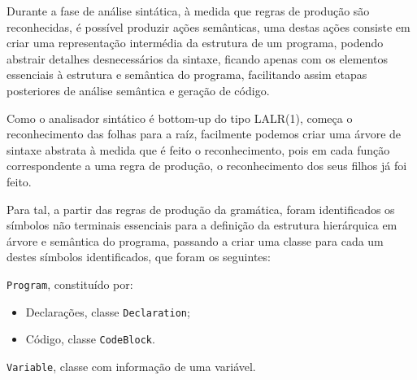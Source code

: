 \documentclass[12pt,a4paper]{report}
\begin{document}
Durante a fase de análise sintática, à medida que regras de produção são reconhecidas, é possível produzir ações semânticas, uma destas ações consiste em criar uma representação intermédia da estrutura de um programa,
podendo abstrair detalhes desnecessários da sintaxe, ficando apenas com os elementos essenciais à estrutura e semântica do programa, facilitando assim etapas posteriores de análise semântica e geração de código.

Como o analisador sintático é bottom-up do tipo LALR(1), começa o reconhecimento das folhas para a raíz, facilmente podemos criar uma árvore de sintaxe abstrata à medida que é feito o reconhecimento,
pois em cada função correspondente a uma regra de produção, o reconhecimento dos seus filhos já foi feito.

Para tal, a partir das regras de produção da gramática, foram identificados os símbolos não terminais essenciais para a definição da estrutura hierárquica em árvore e semântica do programa,
passando a criar uma classe para cada um destes símbolos identificados, que foram os seguintes:

\vspace{5mm}

\texttt{Program}, constituído por:
\begin{itemize}
    \item Declarações, classe \texttt{Declaration};
    \item Código, classe \texttt{CodeBlock}.
\end{itemize}

\vspace{5mm}

\texttt{Variable}, classe com informação de uma variável.

\vspace{5mm}
\end{document}
